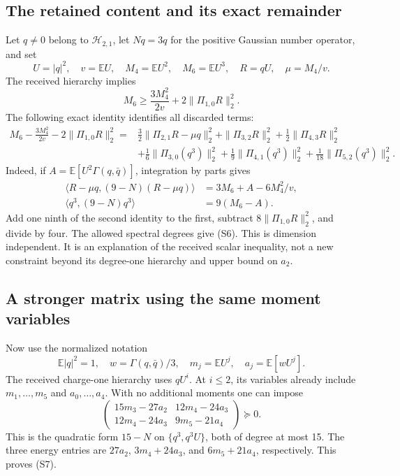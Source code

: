 \subsection{The retained content and its exact remainder}

Let $q\ne0$ belong to $\mathcal H_{2,1}$, let $Nq=3q$ for the positive
Gaussian number operator, and set
\[
 U=|q|^2,\quad v=\mathbb E U,\quad M_4=\mathbb E U^2,
 \quad M_6=\mathbb E U^3,\quad R=qU,\quad\mu=M_4/v.
\]
The received hierarchy implies
\[
 M_6\ge\frac{3M_4^2}{2v}+2\|\Pi_{1,0}R\|_2^2.
\]
The following exact identity identifies all discarded terms:
\begin{align*}
 M_6-\frac{3M_4^2}{2v}-2\|\Pi_{1,0}R\|_2^2
 ={}&\frac32\|\Pi_{2,1}R-\mu q\|_2^2
      +\|\Pi_{3,2}R\|_2^2+\frac12\|\Pi_{4,3}R\|_2^2\\
 &+\frac16\|\Pi_{3,0}(q^3)\|_2^2
      +\frac19\|\Pi_{4,1}(q^3)\|_2^2
      +\frac1{18}\|\Pi_{5,2}(q^3)\|_2^2.
 \tag{S6}
\end{align*}
Indeed, if $A=\mathbb E[U^2\Gamma(q,\bar q)]$, integration by parts gives
\begin{align*}
 \langle R-\mu q,(9-N)(R-\mu q)\rangle
    &=3M_6+A-6M_4^2/v,\\
 \langle q^3,(9-N)q^3\rangle&=9(M_6-A).
\end{align*}
Add one ninth of the second identity to the first, subtract
$8\|\Pi_{1,0}R\|_2^2$, and divide by four. The allowed spectral degrees
give (S6). This is dimension independent. It is an explanation of the
received scalar inequality, not a new constraint beyond its degree-one
hierarchy and upper bound on $a_2$.

\subsection{A stronger matrix using the same moment variables}

Now use the normalized notation
\[
 \mathbb E|q|^2=1,\quad w=\Gamma(q,\bar q)/3,
 \quad m_j=\mathbb E U^j,\quad a_j=\mathbb E[wU^j].
\]
The received charge-one hierarchy uses $qU^i$. At $i\le2$, its variables
already include $m_1,\ldots,m_5$ and $a_0,\ldots,a_4$. With no additional
moments one can impose
\[
 \boxed{\begin{pmatrix}
 15m_3-27a_2&12m_4-24a_3\\
 12m_4-24a_3&9m_5-21a_4
 \end{pmatrix}\succeq0.}
 \tag{S7}
\]
This is the quadratic form $15-N$ on $\{q^3,q^3U\}$, both of degree at most
15. The three energy entries are $27a_2$, $3m_4+24a_3$, and
$6m_5+21a_4$, respectively. This proves (S7).

